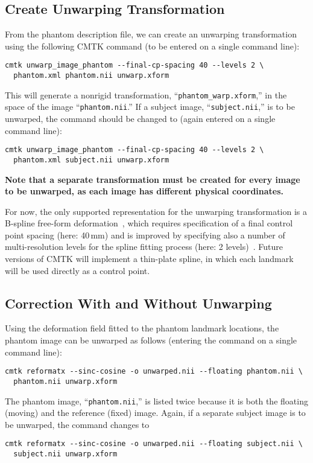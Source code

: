 \documentclass{InsightArticle}
\begin{document}
\subsection{Create Unwarping Transformation}

From the phantom description file, we can create an unwarping transformation
using the following CMTK command (to be entered on a single command line):
\begin{verbatim}
cmtk unwarp_image_phantom --final-cp-spacing 40 --levels 2 \
  phantom.xml phantom.nii unwarp.xform
\end{verbatim} 
This will generate a nonrigid transformation,
``\texttt{phantom\_warp.xform},'' in the space of the image
``\texttt{phantom.nii}.'' If a subject image, ``\texttt{subject.nii},'' is to
be unwarped, the command should be changed to (again entered on a single
command line):
\begin{verbatim}
cmtk unwarp_image_phantom --final-cp-spacing 40 --levels 2 \
  phantom.xml subject.nii unwarp.xform
\end{verbatim}

{\bf Note that a separate transformation must be created for every
  image to be unwarped, as each image has different physical coordinates.}

For now, the only supported representation for the unwarping transformation is
a B-spline free-form deformation~\cite{RuecSonoHaye:1999}, which requires
specification of a final control point spacing (here: 40\,mm) and is improved
by specifying also a number of multi-resolution levels for the spline fitting
process (here: 2 levels)~\cite{LeeWolbShin:1997}. Future versions of CMTK will
implement a thin-plate spline, in which each landmark will be used directly as
a control point.

\subsection{Correction With and Without Unwarping}

Using the deformation field fitted to the phantom landmark locations, the
phantom image can be unwarped as follows (entering the command on a single
command line):
\begin{verbatim}
cmtk reformatx --sinc-cosine -o unwarped.nii --floating phantom.nii \
  phantom.nii unwarp.xform
\end{verbatim} 
The phantom image, ``\texttt{phantom.nii},'' is listed twice
because it is both the floating (moving) and the reference (fixed)
image. Again, if a separate subject image is to be unwarped, the command
changes to
\begin{verbatim}
cmtk reformatx --sinc-cosine -o unwarped.nii --floating subject.nii \
  subject.nii unwarp.xform
\end{verbatim}
\end{document}
